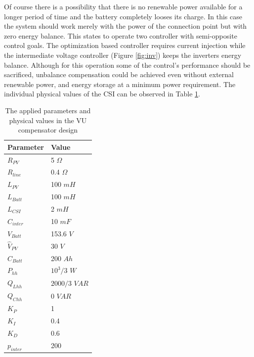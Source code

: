         Of course there is a possibility that there is no renewable power available for a longer period of time and the battery completely looses its charge. In this case the system should work merely with the power of the connection point but with zero energy balance. This states to operate two controller with semi-opposite control goals. The optimization based controller requires current injection while the intermediate voltage controller (Figure \ref{fig:inv}) keeps the inverters energy balance. Although for this operation some of the control's performance should be sacrificed, unbalance compensation could be achieved even without external renewable power, and energy storage at a minimum power requirement. The individual physical values of the CSI can be observed in Table \ref{tbl:params}.\\

        \begin{table}[]
    \center
		\caption{The applied parameters and physical values in the VU compensator design}
        \begin{tabular}{|l|l|}
        \hline
        Parameter      & Value  \\ \hline
        $R_{PV}$     & 5 $\Omega$ \\ \hline
        $R_{line}$  & 0.4 $\Omega$ \\ \hline
        $L_{PV}$ & 100 $mH$\\ \hline
        $L_{Batt}$ & 100 $mH$\\ \hline
        $L_{CSI}$ & 2 $mH$\\ \hline
        $C_{inter}$ & 10 $mF$\\ \hline
        $V_{Batt}$ & 153.6 $V$\\ \hline
        $\widehat{V}_{PV}$ & 30 $V$\\ \hline
        $C_{Batt}$ & 200 $Ah$\\ \hline
        $P_{hh}$ & $10^3/3$ $W$ \\ \hline
        $Q_{Lhh}$ & $2000/3$ $VAR$ \\ \hline
        $Q_{Chh}$ & $0$ $VAR$ \\ \hline
        $K_{P}$ & 1 \\ \hline
        $K_{I}$ & 0.4 \\ \hline
        $K_{D}$ & 0.6 \\ \hline
        $p_{inter}$ & 200\\ \hline
        \end{tabular}
        \label{tbl:params}
    \end{table}

